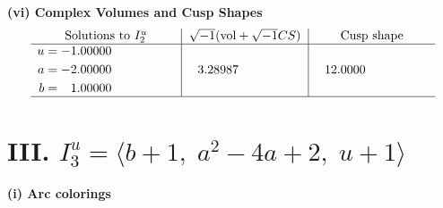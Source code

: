 \documentclass[1p]{elsarticle_modified}
\theoremstyle{definition}
\newcommand{\I}{\sqrt{-1}}
\begin{document}
\newpage\flushleft \textbf{(vi) Complex Volumes and Cusp Shapes}
$$\begin{array}{c|c|c}  
\text{Solutions to }I^u_{2}& \I (\text{vol} + \sqrt{-1}CS) & \text{Cusp shape}\\
 \hline 
\begin{aligned}
u &= -1.00000\phantom{ +0.000000I} \\
a &= -2.00000\phantom{ +0.000000I} \\
b &= \phantom{-}1.00000\phantom{ +0.000000I}\end{aligned}
 & \phantom{-}3.28987\phantom{ +0.000000I} & \phantom{-}12.0000\phantom{ +0.000000I}\\
 \hline 
 \end{array}$$\newpage\newpage\renewcommand{\arraystretch}{1}
\centering \section*{III. $I^u_{3}= \langle b+1,\;a^2-4 a+2,\;u+1 \rangle$}
\flushleft \textbf{(i) Arc colorings}\\
\end{document}
